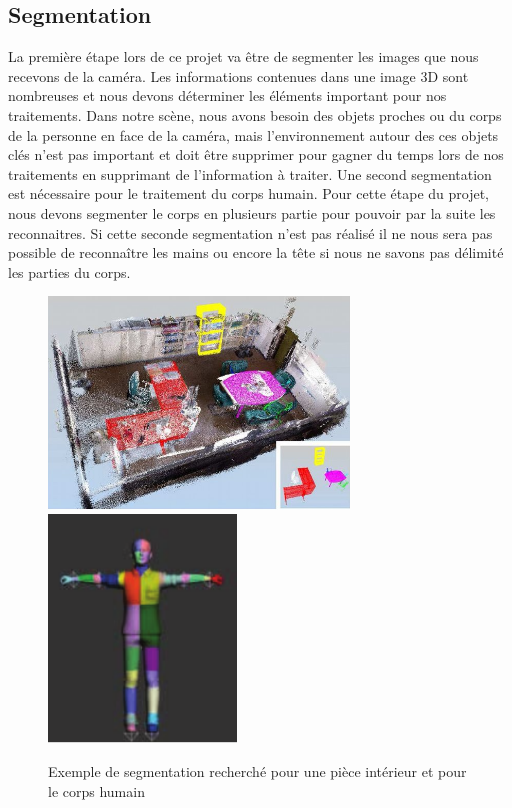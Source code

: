 \subsection{Segmentation}
La première étape lors de ce projet va être de segmenter les images que nous recevons de 
la caméra. Les informations contenues dans une image 3D sont nombreuses et nous devons
déterminer les éléments important pour nos traitements. Dans notre scène,
nous avons besoin des objets proches ou du corps de la personne en face de la caméra, mais 
l'environnement autour des ces objets clés n'est pas important et doit être supprimer pour
gagner du temps lors de nos traitements en supprimant de l'information à traiter.
Une second segmentation est nécessaire pour le traitement du corps humain. Pour cette étape du projet,
nous devons segmenter le corps en plusieurs partie pour pouvoir par la suite les reconnaitres. Si cette
seconde segmentation n'est pas réalisé il ne nous sera pas possible de reconnaître les mains ou encore
la tête si nous ne savons pas délimité les parties du corps.  

\begin{figure}[!h]
  \begin{center}
    \includegraphics[width=8cm]{image/segmentation.png}
    \includegraphics[width=5cm]{image/bodySegmentation.png}
    \caption{Exemple de segmentation recherché pour une pièce intérieur et pour le corps humain}
  \end{center}
\end{figure}
 

